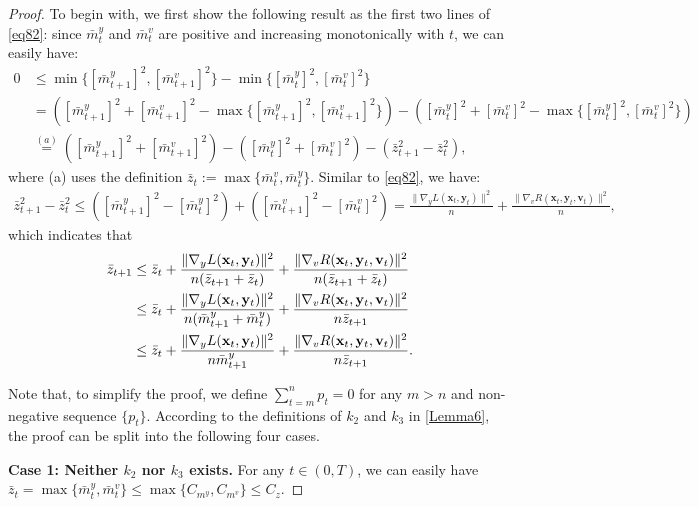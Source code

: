 \documentclass{article}
\theoremstyle{plain}
\theoremstyle{definition}
\theoremstyle{remark}
\begin{document}
\begin{proof}
To begin with, we first show the following result as the first two lines of \cref{eq82}: since $\bar{m}^y_t$ and $\bar{m}^v_t$ are positive and increasing monotonically with $t$, we can easily have:
\begin{align}
0& \leq \min\{[\bar{m}^y_{t+1}]^2, [\bar{m}^v_{t+1}]^2\} - \min\{[\bar{m}^y_{t}]^2, [\bar{m}^v_{t}]^2\} \nonumber\\
&= \left([\bar{m}^y_{t+1}]^2 + [\bar{m}^v_{t+1}]^2 - \max\{[\bar{m}^y_{t+1}]^2, [\bar{m}^v_{t+1}]^2\}\right) - \left([\bar{m}^y_{t}]^2 +[\bar{m}^v_{t}]^2 - \max\{[\bar{m}^y_{t}]^2, [\bar{m}^v_{t}]^2\}\right) \nonumber\\
&\overset{(a)}{=} ([\bar{m}^y_{t+1}]^2 + [\bar{m}^v_{t+1}]^2) - ([\bar{m}^y_{t}]^2 +[\bar{m}^v_{t}]^2) - (\bar{z}_{t+1}^2 - \bar{z}_t^2),\label{eq86}
\end{align}
where (a) uses the definition $\bar{z}_t := \max\{\bar{m}^v_t, \bar{m}^y_t\}$. Similar to \cref{eq82}, we have:
\begin{align}
\bar{z}_{t+1}^2 - \bar{z}_t^2
\leq ([\bar{m}^y_{t+1}]^2-[\bar{m}^y_{t}]^2) + ([\bar{m}^v_{t+1}]^2-[\bar{m}^v_{t}]^2)= \frac{\|\nabla_y L(\mathbf{x}_t, \mathbf{y}_t)\|^2}{n} + \frac{\|\nabla_v R(\mathbf{x}_t, \mathbf{y}_t, \mathbf{v}_t)\|^2}{n},\label{eq87}
\end{align}
which indicates that
\begin{align}
\bar{z}_{t+1} 
&\leq \bar{z}_{t} + \frac{\|\nabla_y L(\mathbf{x}_t, \mathbf{y}_t)\|^2}{n(\bar{z}_{t+1}+\bar{z}_{t})} + \frac{\|\nabla_v R(\mathbf{x}_t, \mathbf{y}_t, \mathbf{v}_t)\|^2}{n(\bar{z}_{t+1}+\bar{z}_{t})} \notag \\
&\leq \bar{z}_{t} + \frac{\|\nabla_y L(\mathbf{x}_t, \mathbf{y}_t)\|^2}{n(\bar{m}^y_{t+1}+\bar{m}^y_{t})} + \frac{\|\nabla_v R(\mathbf{x}_t, \mathbf{y}_t, \mathbf{v}_t)\|^2}{n\bar{z}_{t+1}}\notag \\
&\leq \bar{z}_{t} + \frac{\|\nabla_y L(\mathbf{x}_t, \mathbf{y}_t)\|^2}{n\bar{m}^y_{t+1}} + \frac{\|\nabla_v R(\mathbf{x}_t, \mathbf{y}_t, \mathbf{v}_t)\|^2}{n\bar{z}_{t+1}}.\label{eq88}
\end{align}

Note that, to simplify the proof, we define $\sum_{t=m}^n p_t = 0$ for any $m > n$ and non-negative sequence $\{p_t\}$.
According to the definitions of $k_2$ and $k_3$ in \cref{Lemma6}, the proof can be split into the following four cases.

\textbf{Case 1: Neither $k_2$ nor $k_3$ exists.}  
For any $t \in (0, T)$, we can easily have $\bar{z}_t= \max\{\bar{m}^y_{t}, \bar{m}^v_{t}\} \leq \max\{C_{m^y}, C_{m^v}\} \leq C_z$.


\end{proof}
\end{document}
